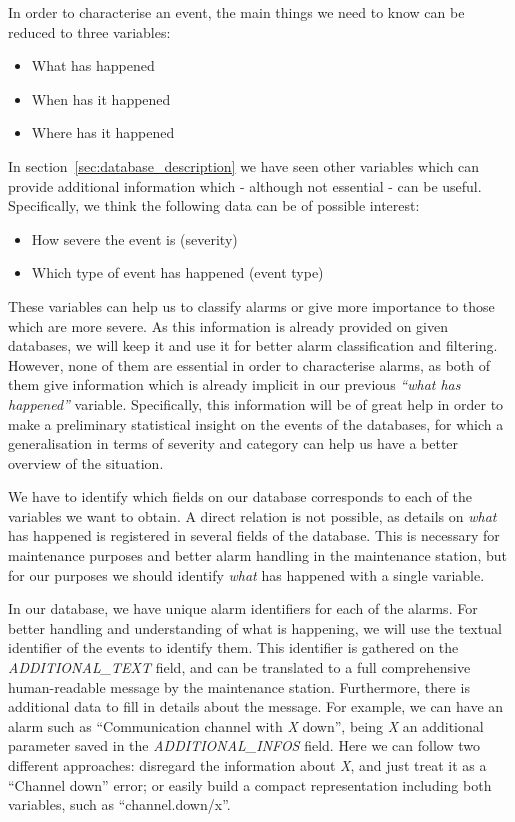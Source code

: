 \documentclass[a4paper,12pt]{article}
\begin{document}
In order to characterise an event, the main things we need to know can be reduced to three variables:
\begin{itemize}
\item What has happened
\item When has it happened
\item Where has it happened
\end{itemize}

In section~\ref{sec:database_description} we have seen other variables which can provide additional information which - although not essential - can be useful. Specifically, we think the following data can be of possible interest:

\begin{itemize}
\item How severe the event is (severity)
\item Which type of event has happened (event type)
\end{itemize}

These variables can help us to classify alarms or give more importance to those which are more severe. As this information is already provided on given databases, we will keep it and use it for better alarm classification and filtering. However, none of them are essential in order to characterise alarms, as both of them give information which is already implicit in our previous \emph{``what has happened''} variable. Specifically, this information will be of great help in order to make a preliminary statistical insight on the events of the databases, for which a generalisation in terms of severity and category can help us have a better overview of the situation.

We have to identify which fields on our database corresponds to each of the variables we want to obtain. A direct relation is not possible, as details on \emph{what} has happened is registered in several fields of the database. This is necessary for maintenance purposes and better alarm handling in the maintenance station, but for our purposes we should identify \emph{what} has happened with a single variable.

In our database, we have unique alarm identifiers for each of the alarms. For better handling and understanding of what is happening, we will use the textual identifier of the events to identify them. This identifier is gathered on the \emph{ADDITIONAL\_TEXT} field, and can be translated to a full comprehensive human-readable message by the maintenance station. Furthermore, there is additional data to fill in details about the message. For example, we can have an alarm such as ``Communication channel with \emph{X} down'', being \emph{X} an additional parameter saved in the \emph{ADDITIONAL\_INFOS} field. Here we can follow two different approaches: disregard the information about \emph{X}, and just treat it as a ``Channel down'' error; or easily build a compact representation including both variables, such as ``channel.down/x''.
\end{document}
